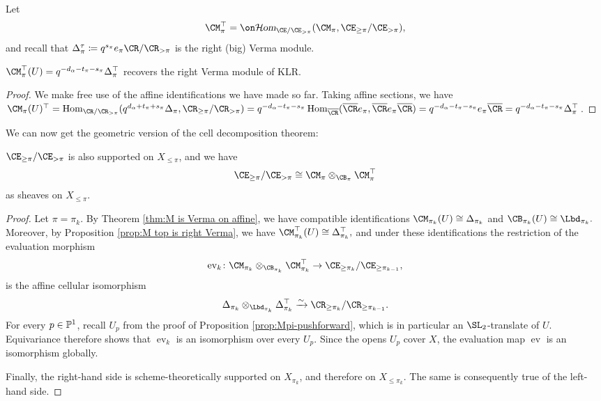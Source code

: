 \documentclass[11pt,reqno]{amsart}
\begin{document}
Let
\[\CM_{\pi}^\top=\shom_{\CE/\CE_{>\pi}}(\CM_{\pi},\CE_{\ge\pi}/\CE_{>\pi}),\] and recall that $\Delta_\pi^\tau\coloneqq q^{s_\pi}e_\pi \CR/\CR_{>\pi}$ is the right (big) Verma module.
\begin{proposition}\label{prop:M top is right Verma}
    $\CM_{\pi}^\top(U)=q^{-d_\alpha-t_\pi-s_\pi}\Delta_{\pi}^\top$ recovers the right Verma module of KLR.
\end{proposition}
\begin{proof}
    We make free use of the affine identifications we have made so far. Taking affine sections, we have $\CM_\pi(U)^\top=\hom_{\CR/\CR_{>\pi}}(q^{d_\alpha+t_\pi+s_\pi}\Delta_\pi,\CR_{\ge\pi}/\CR_{>\pi})=q^{-d_\alpha-t_\pi-s_\pi}\hom_{\ol\CR}(\ol\CR e_\pi, \ol\CR e_\pi\ol\CR)=q^{-d_\alpha-t_\pi-s_\pi}e_\pi\ol\CR=q^{-d_\alpha-t_\pi-s_\pi}\Delta_\pi^\top$. 
\end{proof}

We can now get the geometric version of the cell decomposition theorem:
\begin{theorem}
    $\CE_{\ge\pi}/\CE_{>\pi}$ is also supported on $X_{\le\pi}$, and we have
    \[\CE_{\ge\pi}/\CE_{>\pi}\cong \CM_{\pi}\otimes_{\CB_{\pi}} \CM_{\pi}^\top\] 
    as sheaves on $X_{\le\pi}$. 
\end{theorem}
\begin{proof}
    Let $\pi=\pi_k$. By Theorem \ref{thm:M is Verma on affine}, we have compatible identifications $\CM_{\pi_k}(U)\cong\Delta_{\pi_k}$ and $\CB_{\pi_k}(U)\cong\Lbd_{\pi_k}.$ Moreover, by Proposition \ref{prop:M top is right Verma}, we have $\CM_{\pi_k}^{\top}(U)\cong\Delta_{\pi_k}^{\top},$ and under these identifications the restriction of the evaluation morphism \[\operatorname{ev}_k\colon\CM_{\pi_k}\otimes_{\CB_{\pi_k}}\CM_{\pi_k}^{\top}
\to\CE_{\ge \pi_k}/\CE_{\ge \pi_{k-1}},\]is the affine cellular isomorphism \[\Delta_{\pi_k}\otimes_{\Lbd_{\pi_k}}\Delta_{\pi_k}^{\top}\xrightarrow{\sim}\CR_{\geq\pi_k}/\CR_{\geq\pi_{k-1}}.\] For every $p\in \mathbb P^1$, recall $U_p$ from the proof of Proposition \ref{prop:Mpi-pushforward}, which is in particular an $\SL_2$-translate of $U$. Equivariance therefore shows that
$\operatorname{ev}_k$ is an isomorphism over every $U_p$. Since the
opens $U_p$ cover $X$, the evaluation map $\operatorname{ev}$ is an isomorphism
globally.

Finally, the right-hand side is scheme-theoretically supported on
$X_{\pi_k}$, and therefore on $X_{\leq\pi_k}$. The same is consequently
true of the left-hand side.
\end{proof}
\end{document}
